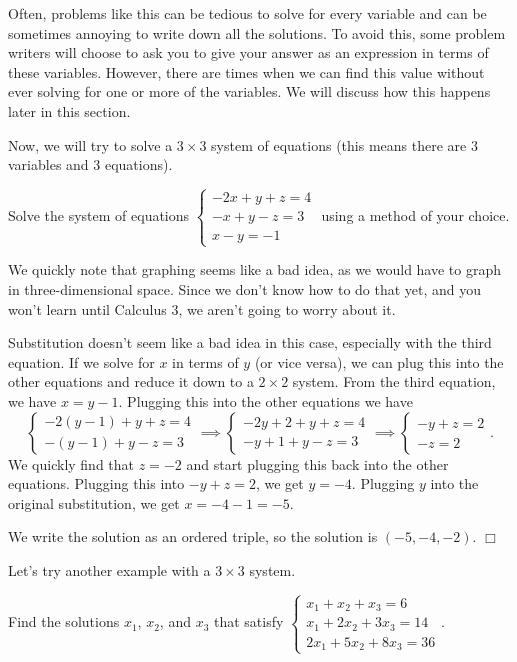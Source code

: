 \documentclass[../book.tex]{subfiles}
\begin{document}
Often, problems like this can be tedious to solve for every variable and can be sometimes annoying to write down all the solutions.  To avoid this, some problem writers will choose to ask you to give your answer as an expression in terms of these variables.  However, there are times when we can find this value without ever solving for one or more of the variables.  We will discuss how this happens later in this section.

Now, we will try to solve a $3\times 3$ system of equations (this means there are $3$ variables and $3$ equations).
\begin{example}
Solve the system of equations $\begin{cases} -2x+y+z=4 \\ -x+y-z=3 \\ x-y=-1 \end{cases}$ using a method of your choice.
\end{example}
\begin{solution}
We quickly note that graphing seems like a bad idea, as we would have to graph in three-dimensional space.  Since we don't know how to do that yet, and you won't learn until Calculus 3, we aren't going to worry about it.

Substitution doesn't seem like a bad idea in this case, especially with the third equation.  If we solve for $x$ in terms of $y$ (or vice versa), we can plug this into the other equations and reduce it down to a $2\times 2$ system.  From the third equation, we have $x=y-1$.  Plugging this into the other equations we have $$\begin{cases} -2(y-1)+y+z=4 \\ -(y-1)+y-z=3 \end{cases} \implies \begin{cases} -2y+2+y+z=4 \\ -y+1+y-z=3 \end{cases} \implies \begin{cases} -y+z=2 \\ -z=2 \end{cases}.$$  We quickly find that $z=-2$ and start plugging this back into the other equations.  Plugging this into $-y+z=2$, we get $y=-4$.  Plugging $y$ into the original substitution, we get $x=-4-1=-5$.

We write the solution as an ordered triple, so the solution is $(-5,-4,-2)$.  $\Box$
\end{solution}
Let's try another example with a $3\times 3$ system.
\begin{example}
Find the solutions $x_1$, $x_2$, and $x_3$ that satisfy $\begin{cases} x_1+x_2+x_3=6 \\ x_1+2x_2+3x_3=14 \\ 2x_1+5x_2+8x_3=36 \end{cases}$.
\end{example}
\end{document}
